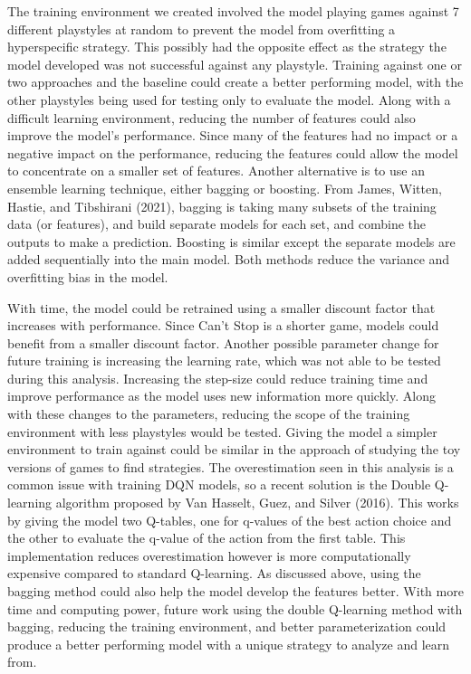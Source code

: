 \documentclass[12pt]{article}
\begin{document}
\begin{thesis}
The training environment we created involved the model playing games against 7 different playstyles at random to prevent the model from overfitting a hyperspecific strategy. This possibly had the opposite effect as the strategy the model developed was not successful against any playstyle. Training against one or two approaches and the baseline could create a better performing model, with the other playstyles being used for testing only to evaluate the model.
Along with a difficult learning environment, reducing the number of features could also improve the model's performance. Since many of the features had no impact or a negative impact on the performance, reducing the features could allow the model to concentrate on a smaller set of features. Another alternative is to use an ensemble learning technique, either bagging or boosting. From James, Witten, Hastie, and Tibshirani (2021), bagging is taking many subsets of the training data (or features), and build separate models for each set, and combine the outputs to make a prediction. Boosting is similar except the separate models are added sequentially into the main model. Both methods reduce the variance and overfitting bias in the model.

With time, the model could be retrained using a smaller discount factor that increases with performance. Since Can't Stop is a shorter game, models could benefit from a smaller discount factor. Another possible parameter change for future training is increasing the learning rate, which was not able to be tested during this analysis. Increasing the step-size could reduce training time and improve performance as the model uses new information more quickly. Along with these changes to the parameters, reducing the scope of the training environment with less playstyles would be tested. Giving the model a simpler environment to train against could be similar in the approach of studying the toy versions of games to find strategies. The overestimation seen in this analysis is a common issue with training DQN models, so a recent solution is the Double Q-learning algorithm proposed by Van Hasselt, Guez, and Silver (2016). This works by giving the model two Q-tables, one for q-values of the best action choice and the other to evaluate the q-value of the action from the first table. This implementation reduces overestimation however is more computationally expensive compared to standard Q-learning. As discussed above, using the bagging method could also help the model develop the features better.
With more time and computing power, future work using the double Q-learning method with bagging, reducing the training environment, and better parameterization could produce a better performing model with a unique strategy to analyze and learn from.


\end{thesis}
\end{document}
